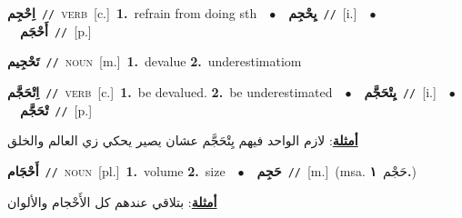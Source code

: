 \documentclass[10pt,a4paper,twoside]{article} %
\begin{document}
\begin{multicols}{2}
{{{{{{{{{{{{\setlength\topsep{0pt}\textbf{\foreignlanguage{arabic}{اِحْجِم}}\ {\color{gray}\texttt{//}\color{black}}\ \textsc{verb}\ [c.]\ \textbf{1.}~refrain from doing sth\ \ $\bullet$\ \ \setlength\topsep{0pt}\textbf{\foreignlanguage{arabic}{يِحْجِم}}\ {\color{gray}\texttt{//}\color{black}}\ [i.]\ \ $\bullet$\ \ \setlength\topsep{0pt}\textbf{\foreignlanguage{arabic}{أَحْجَم}}\ {\color{gray}\texttt{//}\color{black}}\ [p.]\ 

{\setlength\topsep{0pt}\textbf{\foreignlanguage{arabic}{تَحْجِيم}}\ {\color{gray}\texttt{//}\color{black}}\ \textsc{noun}\ [m.]\ \textbf{1.}~devalue  \textbf{2.}~underestimatiom\ 

{\setlength\topsep{0pt}\textbf{\foreignlanguage{arabic}{اِتْحَجَّم}}\ {\color{gray}\texttt{//}\color{black}}\ \textsc{verb}\ [c.]\ \textbf{1.}~be devalued.  \textbf{2.}~be underestimated\ \ $\bullet$\ \ \setlength\topsep{0pt}\textbf{\foreignlanguage{arabic}{يِتْحَجَّم}}\ {\color{gray}\texttt{//}\color{black}}\ [i.]\ \ $\bullet$\ \ \setlength\topsep{0pt}\textbf{\foreignlanguage{arabic}{تْحَجَّم}}\ {\color{gray}\texttt{//}\color{black}}\ [p.]\  \begin{flushright}\color{gray}\foreignlanguage{arabic}{\textbf{\underline{\foreignlanguage{arabic}{أمثلة}}}: لازم الواحد فيهم يِتْحَجَّم عشان يصير يحكي زي العالم والخلق}\end{flushright}\color{black}} \vspace{2mm}

{\setlength\topsep{0pt}\textbf{\foreignlanguage{arabic}{أَحْجَام}}\ {\color{gray}\texttt{//}\color{black}}\ \textsc{noun}\ [pl.]\ \textbf{1.}~volume  \textbf{2.}~size\ \ $\bullet$\ \ \setlength\topsep{0pt}\textbf{\foreignlanguage{arabic}{حَجِم}}\ {\color{gray}\texttt{//}\color{black}}\ [m.]\ \color{gray}(msa. \foreignlanguage{arabic}{حَجْم}~\foreignlanguage{arabic}{\textbf{١.}})\color{black}\  \begin{flushright}\color{gray}\foreignlanguage{arabic}{\textbf{\underline{\foreignlanguage{arabic}{أمثلة}}}: بتلاقي عندهم كل الأَحْجام والألوان}\end{flushright}\color{black}} \vspace{2mm}

}}}}}}}}}}}}}
\end{multicols}
\end{document}
